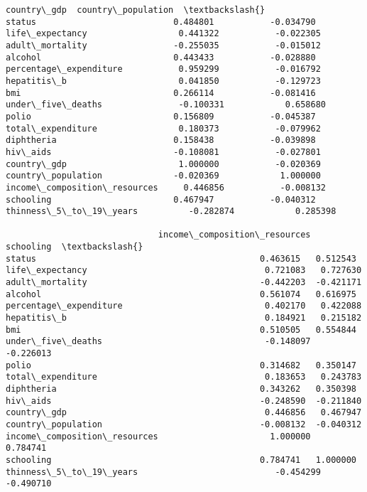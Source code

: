 \documentclass[11pt]{article}
\begin{document}
\begin{Verbatim}[commandchars=\\\{\}]
                              country\_gdp  country\_population  \textbackslash{}
status                           0.484801           -0.034790
life\_expectancy                  0.441322           -0.022305
adult\_mortality                 -0.255035           -0.015012
alcohol                          0.443433           -0.028880
percentage\_expenditure           0.959299           -0.016792
hepatitis\_b                      0.041850           -0.129723
bmi                              0.266114           -0.081416
under\_five\_deaths               -0.100331            0.658680
polio                            0.156809           -0.045387
total\_expenditure                0.180373           -0.079962
diphtheria                       0.158438           -0.039898
hiv\_aids                        -0.108081           -0.027801
country\_gdp                      1.000000           -0.020369
country\_population              -0.020369            1.000000
income\_composition\_resources     0.446856           -0.008132
schooling                        0.467947           -0.040312
thinness\_5\_to\_19\_years          -0.282874            0.285398

                              income\_composition\_resources  schooling  \textbackslash{}
status                                            0.463615   0.512543
life\_expectancy                                   0.721083   0.727630
adult\_mortality                                  -0.442203  -0.421171
alcohol                                           0.561074   0.616975
percentage\_expenditure                            0.402170   0.422088
hepatitis\_b                                       0.184921   0.215182
bmi                                               0.510505   0.554844
under\_five\_deaths                                -0.148097  -0.226013
polio                                             0.314682   0.350147
total\_expenditure                                 0.183653   0.243783
diphtheria                                        0.343262   0.350398
hiv\_aids                                         -0.248590  -0.211840
country\_gdp                                       0.446856   0.467947
country\_population                               -0.008132  -0.040312
income\_composition\_resources                      1.000000   0.784741
schooling                                         0.784741   1.000000
thinness\_5\_to\_19\_years                           -0.454299  -0.490710


\end{Verbatim}
\end{document}
